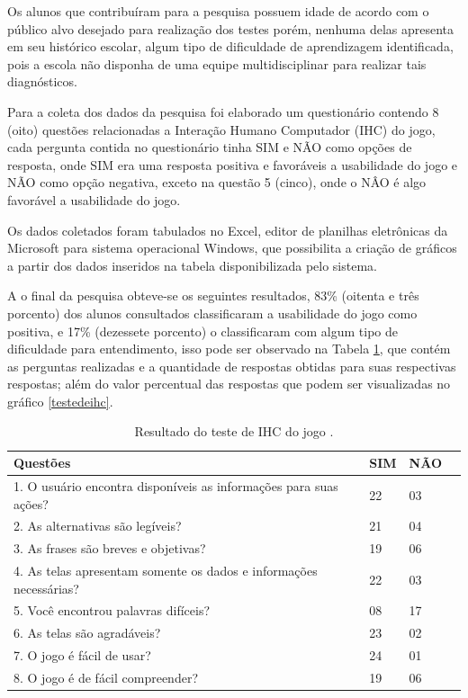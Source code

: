 \documentclass[
	12pt,				%
    oneside,			%
	a4paper,			%
	english,			%
	french,				%
	spanish,			%
	brazil,				%
	]{abntex2}
\begin{document}
Os alunos que contribuíram para a pesquisa possuem idade de acordo com o público alvo desejado para realização dos testes porém, nenhuma delas apresenta em seu histórico escolar, algum tipo de dificuldade de aprendizagem identificada, pois a escola não disponha de uma equipe multidisciplinar para realizar tais diagnósticos.

Para a coleta dos dados da pesquisa foi elaborado um questionário contendo 8 (oito) questões relacionadas a Interação Humano Computador (IHC) do jogo, cada pergunta contida no questionário tinha SIM e NÃO como opções de resposta, onde SIM era uma resposta positiva e favoráveis a usabilidade do jogo  e NÃO como opção negativa, exceto na questão 5 (cinco), onde o NÂO é algo favorável a usabilidade do jogo.

Os dados coletados foram tabulados no Excel, editor de planilhas eletrônicas da Microsoft para sistema operacional Windows, que possibilita a criação de gráficos a partir dos dados inseridos na tabela disponibilizada pelo sistema. 

A o final da pesquisa obteve-se os seguintes resultados, 83\% (oitenta e três porcento) dos alunos consultados classificaram a usabilidade do jogo como positiva, e 17\% (dezessete porcento) o classificaram com algum tipo de dificuldade para entendimento, isso pode ser observado na Tabela \ref{semelhantes}, que contém as perguntas realizadas e a quantidade de respostas obtidas para suas respectivas respostas; além do valor percentual das respostas que podem ser visualizadas no gráfico \ref{testedeihc}.



\begin{table}[h]
\centering
\caption{Resultado do teste de IHC do jogo .}
\label{semelhantes}
\begin{tabular}{|l|l|l|l|}
\hline
Questões    & SIM     & NÃO  \\ \hline
1. O usuário encontra disponíveis as informações para suas ações?    &    22     &   03   \\ \hline
2. As alternativas são legíveis?                                     &    21     &   04   \\ \hline
3. As frases são breves e objetivas?                                 &    19     &   06   \\ \hline
4. As telas apresentam somente os dados e informações necessárias?   &    22     &   03   \\ \hline
5. Você encontrou palavras difíceis?                                 &    08     &   17   \\ \hline
6. As telas são agradáveis?                                          &    23     &   02   \\ \hline
7. O jogo é fácil de usar?                                           &    24     &   01   \\ \hline
8. O jogo é de fácil compreender?                                    &    19     &   06   \\ \hline
\end{tabular}
\end{table}
\end{document}
